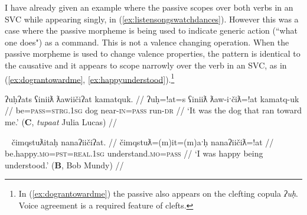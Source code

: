 \begin{comment}


\ex \label{ex:headonback}
\begingl
\glpreamble ʔuc̓aʔap̓at t̓uḥc̓iti hił ʔapw̓inʔatʔi. //
\gla ʔucaap=!at t̓uḥc̓iti hił ʔapw̓in=!at=ʔiˑ //
\glb make.go=\textsc{pass} head be.at shoulder=\textsc{poss.inalien}=\textsc{art} //
\glft `He put his head on his shoulder.' (\textbf{C}, \textit{tupaat} Julia Lucas) //
\endgl
\xe

\ex~ \label{ex:makesitdown}
\begingl
\glpreamble ʔaḥʔaaʔaƛʔał t̓iqʷaasʔap̓aƛʔał ḥaakʷaaƛʔi Monica. //
\gla ʔaḥʔaaʔaƛ=ʔał t̓iqʷ-aas=!ap=!aƛ=ʔał ḥaakʷaaƛ=ʔiˑ Monica //
\glb and.then=\textsc{pl} be.at=\textsc{caus} sit-horizontal.surface=\textsc{caus}=\textsc{now}=\textsc{pl} young.woman=\textsc{art} Monica //
\glft `And then they made the young girl Monica sit on a chair.' (\textbf{C}, \textit{tupaat} Julia Lucas) //
\endgl
\xe
\end{comment}

I have already given an example where the passive scopes over both verbs in an SVC while appearing singly, in (\ref{ex:listensongswatchdances}). However this was a case where the passive morpheme is being used to indicate generic action (``what one does") as a command. This is not a valence changing operation. When the passive morpheme is used to change valence properties, the pattern is identical to the causative and it appears to scope narrowly over the verb in an SVC, as in (\ref{ex:dograntowardme}, \ref{ex:happyunderstood}).\footnote{In (\ref{ex:dograntowardme}) the passive also appears on the clefting copula \textit{ʔuḥ}. Voice agreement is a required feature of clefts.}

\ex \label{ex:dograntowardme}
\begingl
\glpreamble ʔuḥʔats ʕiniiƛ ƛawiičiʔat kamatquk. //
\gla ʔuḥ=!at=s ʕiniiƛ ƛaw-iˑčiƛ=!at kamatq-uk //
\glb be=\textsc{pass}=\textsc{strg.1sg} dog near-\textsc{in}=\textsc{pass} run-\textsc{dr} //
\glft `It was the dog that ran toward me.' (\textbf{C}, \textit{tupaat} Julia Lucas) //
\endgl
\xe

\ex~ \label{ex:happyunderstood}
\begingl
\glpreamble čimqstuƛitaḥ nanaʔiičiʔat. //
\gla čimqstuƛ=(m)it=(m)aˑḥ nanaʔiičiƛ=!at //
\glb be.happy.\textsc{mo}=\textsc{pst}=\textsc{real.1sg} understand.\textsc{mo}=\textsc{pass} //
\glft `I was happy being understood.' (\textbf{B}, Bob Mundy) //
\endgl
\xe

